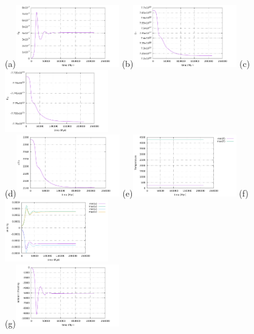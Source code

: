 \begin{center}
(a)\includegraphics[width=4.5cm]{python_codes/fieldstone_24/EBA_104/EK}
(b)\includegraphics[width=4.5cm]{python_codes/fieldstone_24/EBA_104/ET}
(c)\includegraphics[width=4.5cm]{python_codes/fieldstone_24/EBA_104/EG}\\
(d)\includegraphics[width=4.5cm]{python_codes/fieldstone_24/EBA_104/Tavrg}
(e)\includegraphics[width=4.5cm]{python_codes/fieldstone_24/EBA_104/T_stats}
(f)\includegraphics[width=4.5cm]{python_codes/fieldstone_24/EBA_104/vel_stats}\\
(g)\includegraphics[width=4.5cm]{python_codes/fieldstone_24/EBA_104/adiabatic_heating}

\end{center}

